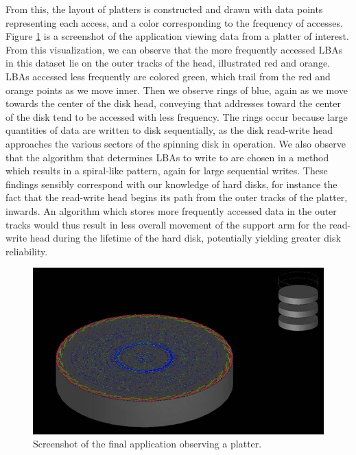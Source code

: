 \documentclass[12pt]{ucthesis}
\begin{document}
\clearpage

From this, the layout of platters is constructed and drawn with data points representing each access, and a color corresponding to the frequency of accesses. Figure \ref{fig:final_disk} is a screenshot of the application viewing data from a platter of interest. From this visualization, we can observe that the more frequently accessed LBAs in this dataset lie on the outer tracks of the head, illustrated red and orange. LBAs accessed less frequently are colored green, which trail from the red and orange points as we move inner. Then we observe rings of blue, again as we move towards the center of the disk head, conveying that addresses toward the center of the disk tend to be accessed with less frequency. The rings occur because large quantities of data are written to disk sequentially, as the disk read-write head approaches the various sectors of the spinning disk in operation. We also observe that the algorithm that determines LBAs to write to are chosen in a method which results in a spiral-like pattern, again for large sequential writes. These findings sensibly correspond with our knowledge of hard disks, for instance the fact that the read-write head begins its path from the outer tracks of the platter, inwards. An algorithm which stores more frequently accessed data in the outer tracks would thus result in less overall movement of the support arm for the read-write head during the lifetime of the hard disk, potentially yielding greater disk reliability.

\begin{figure}[h!]
 \centering
 \includegraphics[width=\textwidth]{images/final_hard_disk.jpg}
 \caption{Screenshot of the final application observing a platter.}
 \label{fig:final_disk}
\end{figure}
\end{document}
